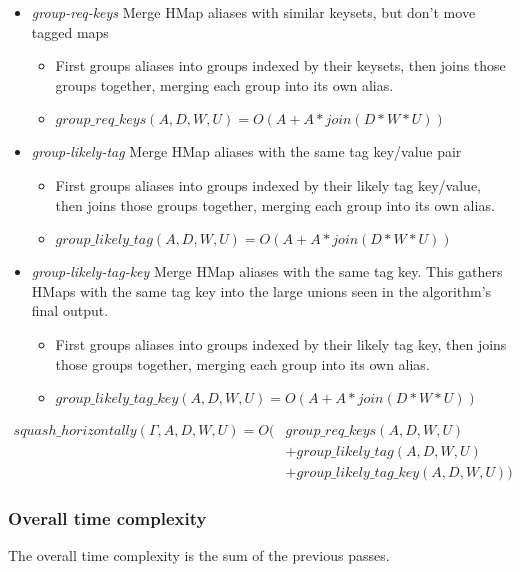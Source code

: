 \begin{itemize}
	\item \emph{group-req-keys} Merge HMap aliases with similar keysets, but
		don't move tagged maps
		\begin{itemize}
			\item First groups aliases into groups indexed by their keysets, then
					joins those groups together, merging each group into its own alias.
			\item $group\_req\_keys(A,D,W,U) = O(A + A*join(D*W*U))$
		\end{itemize}
	\item \emph{group-likely-tag} Merge HMap aliases with the same tag key/value pair
		\begin{itemize}
			\item First groups aliases into groups indexed by their likely tag key/value, then
					joins those groups together, merging each group into its own alias.
			\item $group\_likely\_tag(A,D,W,U) = O(A + A*join(D*W*U))$
		\end{itemize}
	\item \emph{group-likely-tag-key} Merge HMap aliases with the same tag key.
			  This gathers HMaps with the same tag key into the large unions seen in the algorithm's
				final output.
		\begin{itemize}
			\item First groups aliases into groups indexed by their likely tag key, then
					joins those groups together, merging each group into its own alias.
			\item $group\_likely\_tag\_key(A,D,W,U) = O(A + A*join(D*W*U))$
		\end{itemize}
\end{itemize}

\begin{align*}
squash\_horizontally(\Gamma, A, D, W, U) = O(&group\_req\_keys(A,D,W,U)\\
								  													 &+ group\_likely\_tag(A,D,W,U) \\
								  												   &+ group\_likely\_tag\_key(A,D,W,U))
\end{align*}

\subsubsection{Overall time complexity}

The overall time complexity is the sum of the previous passes.

